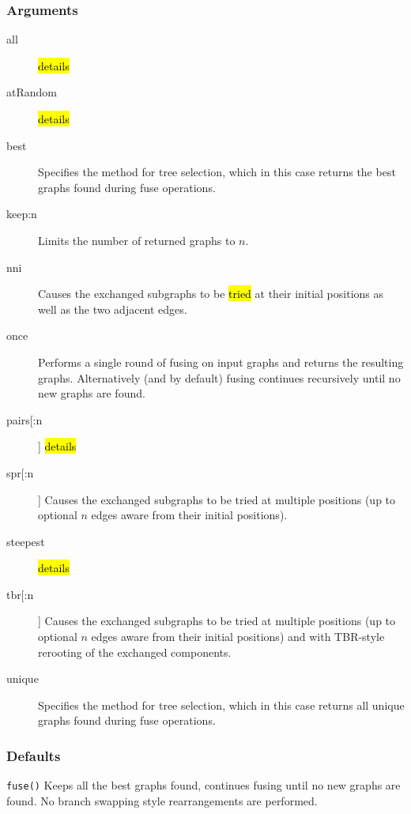 	\subsubsection{Arguments}
	\begin{description}
		\item[all] \hl{details}
		
		\item[atRandom] \hl{details}
		
		\item [best] Specifies the method for tree selection, which in this case returns the best graphs 
		found during fuse operations.		
		
		\item [keep:n] Limits the number of returned graphs to $n$. 
		
		\item [nni] Causes the exchanged subgraphs to be \hl{tried} at their initial positions as well as the 
		two adjacent edges.
		
		\item [once] Performs a single round of fusing on input graphs and returns the resulting graphs. 
		Alternatively (and by default) fusing continues recursively until no new graphs are found.
		
		\item[pairs[:n]] \hl{details}
		
		\item [spr[:n]] Causes the exchanged subgraphs to be tried at multiple positions (up to optional 
		$n$ edges aware from their initial positions).
		
		\item[steepest] \hl{details}
		
		\item [tbr[:n]] Causes the exchanged subgraphs to be tried at multiple positions (up to optional 
		$n$ edges aware from their initial positions) and with TBR-style rerooting of the exchanged 
		components.
		
		\item [unique] Specifies the method for tree selection, which in this case returns all unique 
		graphs found during fuse operations.	
	\end{description}	
	
	\subsubsection{Defaults}
		\texttt{fuse()} Keeps all the best graphs found, continues fusing until no new graphs are found. 
		No branch swapping style rearrangements are performed.
	

